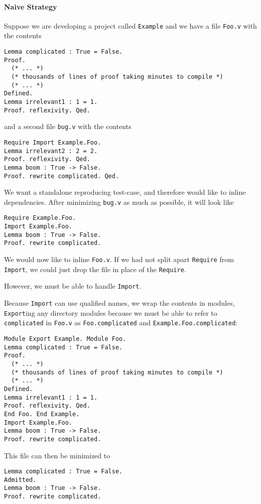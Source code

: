\documentclass[a4paper,USenglish,cleveref,autoref,thm-restate]{lipics-v2021}
\begin{document}
\paragraph{Naive Strategy}

Suppose we are developing a project called \verb|Example| and we have a file \verb|Foo.v| with the contents
\begin{verbatim}
Lemma complicated : True = False.
Proof.
  (* ... *)
  (* thousands of lines of proof taking minutes to compile *)
  (* ... *)
Defined.
Lemma irrelevant1 : 1 = 1.
Proof. reflexivity. Qed.
\end{verbatim}
and a second file \verb|bug.v| with the contents
\begin{verbatim}
Require Import Example.Foo.
Lemma irrelevant2 : 2 = 2.
Proof. reflexivity. Qed.
Lemma boom : True -> False.
Proof. rewrite complicated. Qed.
\end{verbatim}

We want a standalone reproducing test-case, and therefore would like to inline dependencies.
After minimizing \verb|bug.v| as much as possible, it will look like
\begin{verbatim}
Require Example.Foo.
Import Example.Foo.
Lemma boom : True -> False.
Proof. rewrite complicated.
\end{verbatim}

We would now like to inline \verb|Foo.v|.
If we had not split apart \verb|Require| from \verb|Import|, we could just drop the file in place of the \verb|Require|.

However, we must be able to handle \verb|Import|.

Because \verb|Import| can use qualified names, we wrap the contents in modules, \verb|Export|ing any directory modules because we must be able to refer to \verb|complicated| in \verb|Foo.v| as \verb|Foo.complicated| and \verb|Example.Foo.complicated|:
\begin{verbatim}
Module Export Example. Module Foo.
Lemma complicated : True = False.
Proof.
  (* ... *)
  (* thousands of lines of proof taking minutes to compile *)
  (* ... *)
Defined.
Lemma irrelevant1 : 1 = 1.
Proof. reflexivity. Qed.
End Foo. End Example.
Import Example.Foo.
Lemma boom : True -> False.
Proof. rewrite complicated.
\end{verbatim}

This file can then be minimized to
\begin{verbatim}
Lemma complicated : True = False.
Admitted.
Lemma boom : True -> False.
Proof. rewrite complicated.
\end{verbatim}
\end{document}
